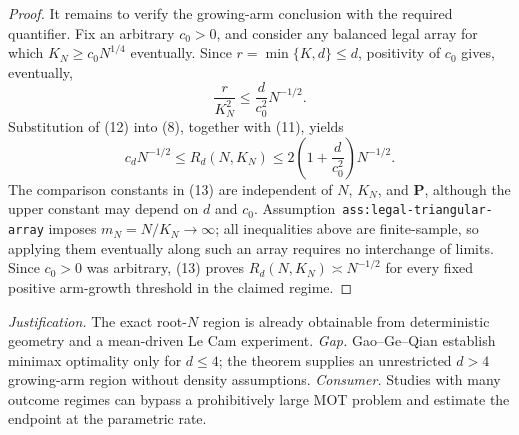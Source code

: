 \documentclass{article}
\begin{document}
\begin{proof}
It remains to verify the growing-arm conclusion with the required quantifier.  Fix an arbitrary \(c_0>0\), and consider any balanced legal array for which \(K_N\geq c_0N^{1/4}\) eventually.  Since \(r=\min\{K,d\}\leq d\), positivity of \(c_0\) gives, eventually,
\[
\frac r{K_N^2}\leq\frac d{c_0^2}N^{-1/2}.
\tag{12}
\]
Substitution of (12) into (8), together with (11), yields
\[
c_dN^{-1/2}
\leq R_d(N,K_N)
\leq 2\left(1+\frac d{c_0^2}\right)N^{-1/2}.
\tag{13}
\]
The comparison constants in (13) are independent of \(N\), \(K_N\), and \(\mathbf P\), although the upper constant may depend on \(d\) and \(c_0\).  Assumption~\texttt{ass:legal-triangular-array} imposes \(m_N=N/K_N\to\infty\); all inequalities above are finite-sample, so applying them eventually along such an array requires no interchange of limits.  Since \(c_0>0\) was arbitrary, (13) proves \(R_d(N,K_N)\asymp N^{-1/2}\) for every fixed positive arm-growth threshold in the claimed regime.
\end{proof}
\par\smallskip\noindent \textit{Justification.} The exact root-\(N\) region is already obtainable from deterministic geometry and a mean-driven Le Cam experiment. \textit{Gap.} Gao--Ge--Qian establish minimax optimality only for \(d\le4\); the theorem supplies an unrestricted \(d>4\) growing-arm region without density assumptions. \textit{Consumer.} Studies with many outcome regimes can bypass a prohibitively large MOT problem and estimate the endpoint at the parametric rate.
\end{document}
